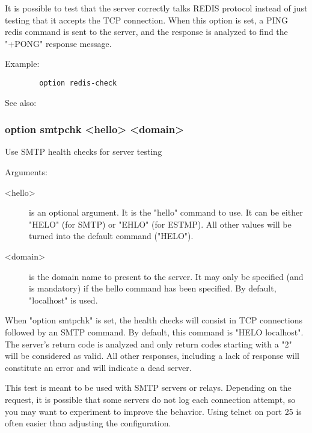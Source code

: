   It is possible to test that the server correctly talks REDIS protocol instead
  of just testing that it accepts the TCP connection. When this option is set,
  a PING redis command is sent to the server, and the response is analyzed to
  find the "+PONG" response message.

  Example:
\begin{verbatim}
        option redis-check
\end{verbatim}


See also: 

\subsubsection[smtpchk]{}
\subsubsection*{option smtpchk <hello> <domain>}

  Use SMTP health checks for server testing


  Arguments:
  
\begin{description}
\item[<hello>]   is an optional argument. It is the "hello" command to use. It can
              be either "HELO" (for SMTP) or "EHLO" (for ESTMP). All other
              values will be turned into the default command ("HELO").

\item[<domain>] is the domain name to present to the server. It may only be
              specified (and is mandatory) if the hello command has been
              specified. By default, "localhost" is used.
\end{description}

  When "option smtpchk" is set, the health checks will consist in TCP
  connections followed by an SMTP command. By default, this command is
  "HELO localhost". The server's return code is analyzed and only return codes
  starting with a "2" will be considered as valid. All other responses,
  including a lack of response will constitute an error and will indicate a
  dead server.

  This test is meant to be used with SMTP servers or relays. Depending on the
  request, it is possible that some servers do not log each connection attempt,
  so you may want to experiment to improve the behavior. Using telnet on port
  25 is often easier than adjusting the configuration.

